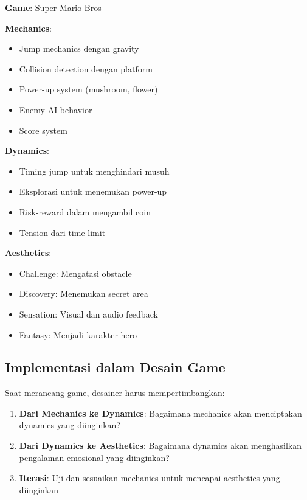 \begin{contoh}
\textbf{Game}: Super Mario Bros

\textbf{Mechanics}:
\begin{itemize}
\item Jump mechanics dengan gravity
\item Collision detection dengan platform
\item Power-up system (mushroom, flower)
\item Enemy AI behavior
\item Score system
\end{itemize}

\textbf{Dynamics}:
\begin{itemize}
\item Timing jump untuk menghindari musuh
\item Eksplorasi untuk menemukan power-up
\item Risk-reward dalam mengambil coin
\item Tension dari time limit
\end{itemize}

\textbf{Aesthetics}:
\begin{itemize}
\item Challenge: Mengatasi obstacle
\item Discovery: Menemukan secret area
\item Sensation: Visual dan audio feedback
\item Fantasy: Menjadi karakter hero
\end{itemize}
\end{contoh}

\subsection{Implementasi dalam Desain Game}

Saat merancang game, desainer harus mempertimbangkan:
\begin{enumerate}
\item \textbf{Dari Mechanics ke Dynamics}: Bagaimana mechanics akan menciptakan dynamics yang diinginkan?
\item \textbf{Dari Dynamics ke Aesthetics}: Bagaimana dynamics akan menghasilkan pengalaman emosional yang diinginkan?
\item \textbf{Iterasi}: Uji dan sesuaikan mechanics untuk mencapai aesthetics yang diinginkan
\end{enumerate}

